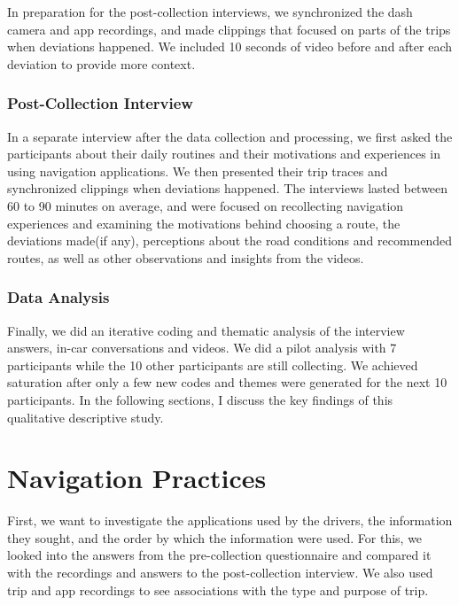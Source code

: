 In preparation for the post-collection interviews, we synchronized the dash camera and app recordings, and made clippings that focused on parts of the trips when deviations happened. We included 10 seconds of video before and after each deviation to provide more context.

\subsubsection{Post-Collection Interview}
In a separate interview after the data collection and processing, we first asked the participants about their daily routines and their motivations and experiences in using navigation applications. We then presented their trip traces and synchronized clippings when deviations happened. The interviews lasted between 60 to 90 minutes on average, and were focused on recollecting navigation experiences and examining the motivations behind choosing a route, the deviations made(if any), perceptions about the road conditions and recommended routes, as well as other observations and insights from the videos. 

\subsubsection{Data Analysis}
Finally, we did an iterative coding and thematic analysis of the interview answers, in-car conversations and videos. We did a pilot analysis with 7 participants while the 10 other participants are still collecting. We achieved saturation after only a few new codes and themes were generated for the next 10 participants. In the following sections, I discuss the key findings of this qualitative descriptive study.

\section{Navigation Practices}
First, we want to investigate the applications used by the drivers, the information they sought, and the order by which the information were used. For this, we looked into the answers from the pre-collection questionnaire and compared it with the recordings and answers to the post-collection interview. We also used trip and app recordings to see associations with the type and purpose of trip. 

